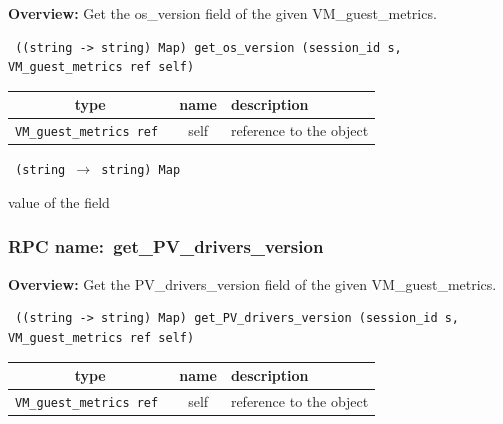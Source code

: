 {\bf Overview:} 
Get the os\_version field of the given VM\_guest\_metrics.

\begin{verbatim} ((string -> string) Map) get_os_version (session_id s, VM_guest_metrics ref self)\end{verbatim}



 
\vspace{0.3cm}
\begin{tabular}{|c|c|p{7cm}|}
 \hline
{\bf type} & {\bf name} & {\bf description} \\ \hline
{\tt VM\_guest\_metrics ref } & self & reference to the object \\ \hline 

\end{tabular}

\vspace{0.3cm}

{\tt 
(string $\rightarrow$ string) Map
}


value of the field
\vspace{0.3cm}
\vspace{0.3cm}
\vspace{0.3cm}
\subsubsection{RPC name:~get\_PV\_drivers\_version}

{\bf Overview:} 
Get the PV\_drivers\_version field of the given VM\_guest\_metrics.

\begin{verbatim} ((string -> string) Map) get_PV_drivers_version (session_id s, VM_guest_metrics ref self)\end{verbatim}



 
\vspace{0.3cm}
\begin{tabular}{|c|c|p{7cm}|}
 \hline
{\bf type} & {\bf name} & {\bf description} \\ \hline
{\tt VM\_guest\_metrics ref } & self & reference to the object \\ \hline 

\end{tabular}

\vspace{0.3cm}

